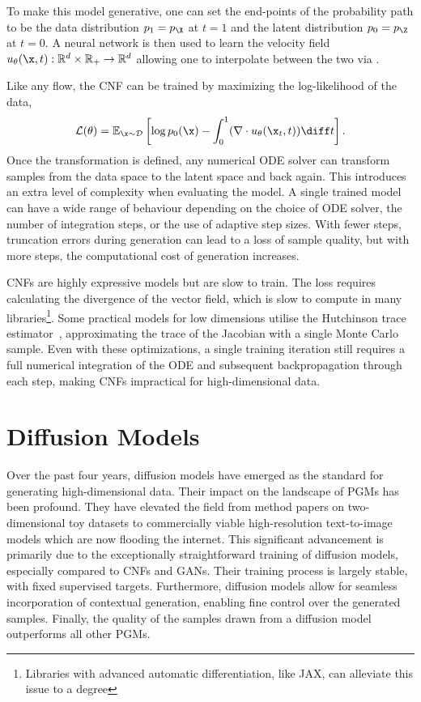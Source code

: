 To make this model generative, one can set the end-points of the probability path to be the data distribution $p_1 = p_\X$ at $t=1$ and the latent distribution $p_0 = p_\Z$ at $t=0$.
A neural network is then used to learn the velocity field $u_\theta(\x, t): \mathbb{R}^d \times \mathbb{R}_{+} \rightarrow \mathbb{R}^d$ allowing one to interpolate between the two via .

Like any flow, the CNF can be trained by maximizing the log-likelihood of the data,
\begin{equation}
    \label{eq:cnf_loss}
    \mathcal{L}(\theta) = \mathbb{E}_{\x \sim \mathcal{D}}\left[\log p_0(\x) - \int_0^1 (\nabla \cdot u_\theta(\x_t, t)) \diff t\right].
\end{equation}
Once the transformation is defined, any numerical ODE solver can transform samples from the data space to the latent space and back again.
This introduces an extra level of complexity when evaluating the model.
A single trained model can have a wide range of behaviour depending on the choice of ODE solver, the number of integration steps, or the use of adaptive step sizes.
With fewer steps, truncation errors during generation can lead to a loss of sample quality, but with more steps, the computational cost of generation increases.

CNFs are highly expressive models but are slow to train.
The loss requires calculating the divergence of the vector field, which is slow to compute in many libraries\footnote{Libraries with advanced automatic differentiation, like JAX\cite{JAX}, can alleviate this issue to a degree}.
Some practical models for low dimensions utilise the Hutchinson trace estimator~\cite{FFJORD},  approximating the trace of the Jacobian with a single Monte Carlo sample.
Even with these optimizations, a single training iteration still requires a full numerical integration of the ODE and subsequent backpropagation through each step, making CNFs impractical for high-dimensional data.


\section{Diffusion Models}

Over the past four years, diffusion models have emerged as the standard for generating high-dimensional data.
Their impact on the landscape of PGMs has been profound.
They have elevated the field from method papers on two-dimensional toy datasets to commercially viable high-resolution text-to-image models which are now flooding the internet.
This significant advancement is primarily due to the exceptionally straightforward training of diffusion models, especially compared to CNFs and GANs.
Their training process is largely stable, with fixed supervised targets.
Furthermore, diffusion models allow for seamless incorporation of contextual generation, enabling fine control over the generated samples.
Finally, the quality of the samples drawn from a diffusion model outperforms all other PGMs.

